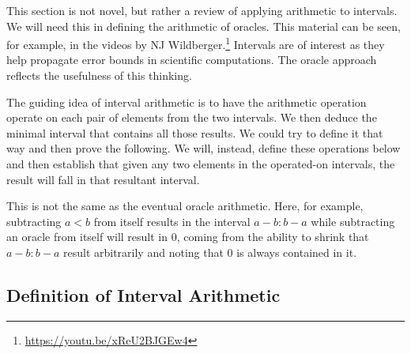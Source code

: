 \documentclass[12pt]{article}
\begin{document}
This section is not novel, but rather a review of applying arithmetic to intervals. We will need this in defining the arithmetic of oracles. This material can be seen, for example, in the videos by NJ Wildberger.\footnote{\url{https://youtu.be/xReU2BJGEw4}} Intervals are of interest as they help propagate error bounds in scientific computations. The oracle approach reflects the usefulness of this thinking. 

The guiding idea of interval arithmetic is to have the arithmetic operation operate on each pair of elements from the two intervals. We then deduce the minimal interval that contains all those results. We could try to define it that way and then prove the following. We will, instead, define these operations below and then establish that given any two elements in the operated-on intervals, the result will fall in that resultant interval. 

This is not the same as the eventual oracle arithmetic. Here, for example, subtracting $a<b$ from itself results in the interval $a-b:b-a$ while subtracting an oracle from itself will result in $0$, coming from the ability to shrink that $a-b:b-a$ result arbitrarily and noting that $0$ is always contained in it. 

\subsection{Definition of Interval Arithmetic}
\end{document}
